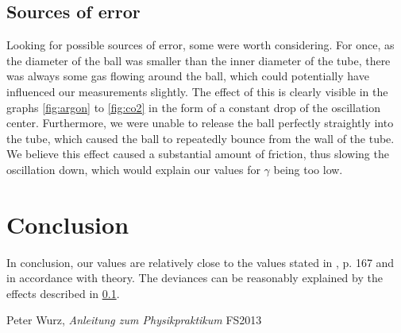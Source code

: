 \documentclass{scrreprt}
\begin{document}
\subsection{Sources of error}
\label{sec:error}
Looking for possible sources of error, some were worth considering. For once, as the diameter of the ball was smaller than the inner diameter of the tube, there was always some gas flowing around the ball, which could potentially have influenced our measurements slightly. The effect of this is clearly visible in the graphs \ref{fig:argon} to \ref{fig:co2} in the form of a constant drop of the oscillation center. Furthermore, we were unable to release the ball perfectly straightly into the tube, which caused the ball to repeatedly bounce from the wall of the tube. We believe this effect caused a substantial amount of friction, thus slowing the oscillation down, which would explain our values for $\gamma$ being too low.

\section{Conclusion}

In conclusion, our values are relatively close to the values stated in \cite{physcript13}, p. 167 and in accordance with theory. The deviances can be reasonably explained by the effects described in \ref{sec:error}.

\begin{thebibliography}{9}

  Peter Wurz,
  \emph{Anleitung zum Physikpraktikum}
  FS2013

\end{thebibliography}
\end{document}

